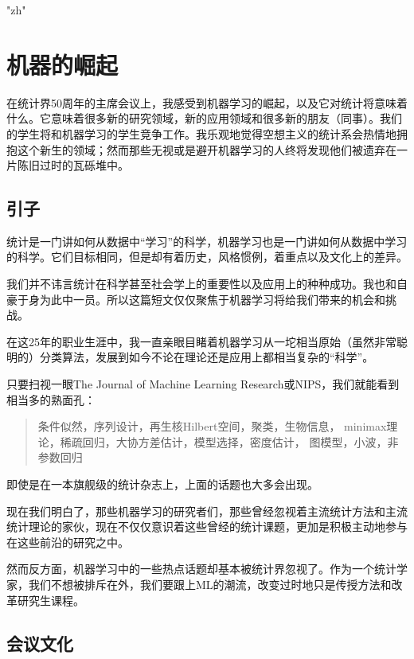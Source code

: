 \documentclass[]{article}
\author{}
\date{}
\begin{document}
\setmainfont{楷体}
\XeTeXlinebreaklocale "zh"
\newcommand{\EE}{ {\mathbb{E}} }
\newcommand{\RR}{ {\mathbb{R}} }
\newcommand{\PP}{ {\mathcal{P}} }
\newcommand{\UU}{ {\mathcal{U}} }
\newcommand{\LL}{ {\mathcal{L}} }
\section{机器的崛起}

在统计界50周年的主席会议上，我感受到机器学习的崛起，以及它对统计将意味着什么。它意味着很多新的研究领域，新的应用领域和很多新的朋友（同事）。我们的学生将和机器学习的学生竞争工作。我乐观地觉得空想主义的统计系会热情地拥抱这个新生的领域；然而那些无视或是避开机器学习的人终将发现他们被遗弃在一片陈旧过时的瓦砾堆中。

\subsection{引子}

统计是一门讲如何从数据中``学习''的科学，机器学习也是一门讲如何从数据中学习的科学。它们目标相同，但是却有着历史，风格惯例，着重点以及文化上的差异。

我们并不讳言统计在科学甚至社会学上的重要性以及应用上的种种成功。我也和自豪于身为此中一员。所以这篇短文仅仅聚焦于机器学习将给我们带来的机会和挑战。

在这25年的职业生涯中，我一直亲眼目睹着机器学习从一坨相当原始（虽然非常聪明的）分类算法，发展到如今不论在理论还是应用上都相当复杂的``科学''。

只要扫视一眼The Journal of Machine Learning Research或NIPS，我们就能看到相当多的熟面孔：
\begin{quote} 
    条件似然，序列设计，再生核Hilbert空间，聚类，生物信息，
    minimax理论，稀疏回归，大协方差估计，模型选择，密度估计，
    图模型，小波，非参数回归
\end{quote}
即使是在一本旗舰级的统计杂志上，上面的话题也大多会出现。

现在我们明白了，那些机器学习的研究者们，那些曾经忽视着主流统计方法和主流统计理论的家伙，现在不仅仅意识着这些曾经的统计课题，更加是积极主动地参与在这些前沿的研究之中。

然而反方面，机器学习中的一些热点话题却基本被统计界忽视了。作为一个统计学家，我们不想被排斥在外，我们要跟上ML的潮流，改变过时地只是传授方法和改革研究生课程。

\subsection{会议文化}
\end{document}
